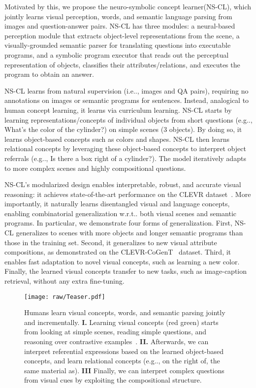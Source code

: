\documentclass{article} \usepackage{iclr2019_conference,times}
\makeatletter
\def\vs{{\bm{s}}}
\DeclareRobustCommand\onedot{\futurelet\@let@token\@onedot}
\def\@onedot{\ifx\@let@token.\else.\null\fi\xspace}
\def\eg{e.g\onedot} \def\Eg{E.g\onedot}
\def\ie{i.e\onedot} \def\Ie{I.e\onedot}
\def\wrt{w.r.t\onedot} \def\dof{d.o.f\onedot}
\newcommand{\modelfull}{neuro-symbolic concept learner\xspace}
\newcommand{\model}{NS-CL\xspace}
\makeatother
\begin{document}
Motivated by this, we propose the \modelfull (\model), which jointly learns visual perception, words, and semantic language parsing from images and question-answer pairs. \model has three modules: a neural-based perception module that extracts object-level representations from the scene, a visually-grounded semantic parser for translating questions into executable programs, and a symbolic program executor that reads out the perceptual representation of objects, classifies their attributes/relations, and executes the program to obtain an answer.


\model learns from natural supervision (\ie, images and QA pairs), requiring no annotations on images or semantic programs for sentences. Instead, analogical to human concept learning, it learns via curriculum learning. \model starts by learning representations/concepts of individual objects from short questions (\eg, What's the color of the cylinder?) on simple scenes (3 objects). By doing so, it learns object-based concepts such as colors and shapes. \model then learns relational concepts by leveraging these object-based concepts to interpret object referrals (\eg, Is there a box right of a cylinder?). The model iteratively adapts to more complex scenes and highly compositional questions. 





\model's modularized design enables interpretable, robust, and accurate visual reasoning: it achieves state-of-the-art performance on the CLEVR dataset~\citep{Johnson2017CLEVR}. More importantly, it naturally learns disentangled visual and language concepts, enabling combinatorial generalization \wrt both visual scenes and semantic programs. In particular, we demonstrate four forms of generalization. First, \model generalizes to scenes with more objects and longer semantic programs than those in the training set. Second, it generalizes to new visual attribute compositions, as demonstrated on the CLEVR-CoGenT~\citep{Johnson2017CLEVR} dataset. Third, it enables fast adaptation to novel visual concepts, such as learning a new color. Finally, the learned visual concepts transfer to new tasks, such as image-caption retrieval, without any extra fine-tuning.



\begin{figure}[t]
\centering
\texttt{[image: raw/Teaser.pdf]}
\caption{Humans learn visual concepts, words, and semantic parsing jointly and incrementally. {\bf I.} Learning visual concepts (red \vs green) starts from looking at simple scenes, reading simple questions, and reasoning over contrastive examples~\citep{fazly2010probabilistic}. {\bf II.} Afterwards, we can interpret referential expressions based on the learned object-based concepts, and learn relational concepts (\eg, on the right of, the same material as). {\bf III} Finally, we can interpret complex questions from visual cues by exploiting the compositional structure.}
\label{fig:teaser}
\vspace{-5pt}
\end{figure}
\end{document}
